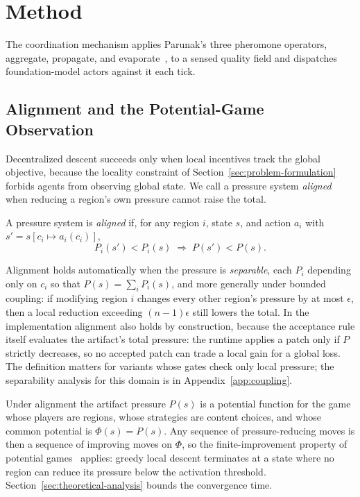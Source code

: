 
\section{Method}
\label{sec:method}

The coordination mechanism applies Parunak's three pheromone operators, aggregate, propagate, and evaporate~\cite{parunak2011mean}, to a sensed quality field and dispatches foundation-model actors against it each tick.

\subsection{Alignment and the Potential-Game Observation}

Decentralized descent succeeds only when local incentives track the global objective, because the locality constraint of Section~\ref{sec:problem-formulation} forbids agents from observing global state. We call a pressure system \emph{aligned} when reducing a region's own pressure cannot raise the total.

\begin{definition}
A pressure system is \emph{aligned} if, for any region $i$, state $s$, and action $a_i$ with $s' = s[c_i \mapsto a_i(c_i)]$,
\[
P_i(s') < P_i(s) \;\Longrightarrow\; P(s') < P(s).
\]
\end{definition}

Alignment holds automatically when the pressure is \emph{separable}, each $P_i$ depending only on $c_i$ so that $P(s) = \sum_i P_i(s)$, and more generally under bounded coupling: if modifying region $i$ changes every other region's pressure by at most $\epsilon$, then a local reduction exceeding $(n-1)\epsilon$ still lowers the total. In the implementation alignment also holds by construction, because the acceptance rule itself evaluates the artifact's total pressure: the runtime applies a patch only if $P$ strictly decreases, so no accepted patch can trade a local gain for a global loss. The definition matters for variants whose gates check only local pressure; the separability analysis for this domain is in Appendix~\ref{app:coupling}.

Under alignment the artifact pressure $P(s)$ is a potential function for the game whose players are regions, whose strategies are content choices, and whose common potential is $\Phi(s) = P(s)$. Any sequence of pressure-reducing moves is then a sequence of improving moves on $\Phi$, so the finite-improvement property of potential games~\cite{monderer1996potential} applies: greedy local descent terminates at a state where no region can reduce its pressure below the activation threshold. Section~\ref{sec:theoretical-analysis} bounds the convergence time.

